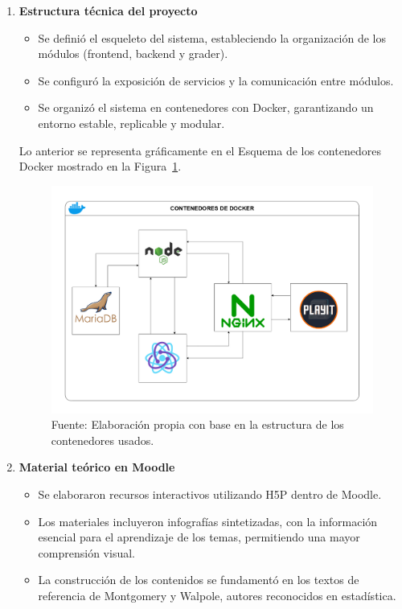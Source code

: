 \documentclass[letter,oneside,12pt,spanish]{report}
\begin{document}
\begin{enumerate}
	\item \textbf{Estructura técnica del proyecto}
	\begin{itemize}
		\item Se definió el esqueleto del sistema, estableciendo la organización de los módulos (frontend, backend y grader).
		\item Se configuró la exposición de servicios y la comunicación entre módulos.
		\item Se organizó el sistema en contenedores con Docker, garantizando un entorno estable, replicable y modular.
	\end{itemize}
	
\noindent Lo anterior se representa gráficamente en el Esquema de los contenedores Docker mostrado en la Figura~\ref{fig:Diagrama-Docker}.

\begin{figure}[ht]
	\centering
	\includegraphics[width=1\textwidth]{Figs/Diagrama_contenedores.pdf}
	\label{fig:Diagrama-Docker}
	\\Fuente: Elaboración propia con base en la estructura de los contenedores usados.
\end{figure}

    \item \textbf{Material teórico en Moodle}
\begin{itemize}
	\item Se elaboraron recursos interactivos utilizando H5P dentro de Moodle.
	\item Los materiales incluyeron infografías sintetizadas, con la información esencial para el aprendizaje de los temas, permitiendo una mayor comprensión visual.
	\item La construcción de los contenidos se fundamentó en los textos de referencia de Montgomery y Walpole, autores reconocidos en estadística.
\end{itemize}


\end{enumerate}
\end{document}

